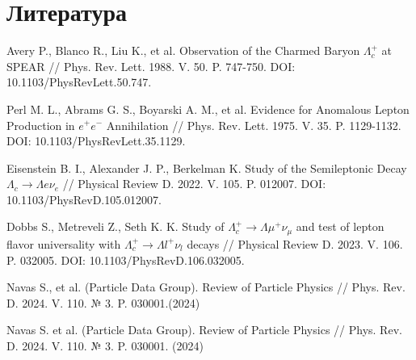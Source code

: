 \section{Литература}

\begin{thebibliography}{99}

    Avery P., Blanco R., Liu K., et al. Observation of the Charmed Baryon $\Lambda^+_c$ at SPEAR // Phys. Rev. Lett. 1988. V. 50. P. 747-750. DOI: 10.1103/PhysRevLett.50.747.
    
    Perl M. L., Abrams G. S., Boyarski A. M., et al. Evidence for Anomalous Lepton Production in $e^+e^-$ Annihilation // Phys. Rev. Lett. 1975. V. 35. P. 1129-1132. DOI: 10.1103/PhysRevLett.35.1129.
    
    Eisenstein B. I., Alexander J. P., Berkelman K. Study of the Semileptonic Decay $\Lambda_c \rightarrow \Lambda e \nu_e$ // Physical Review D. 2022. V. 105. P. 012007. DOI: 10.1103/PhysRevD.105.012007.
    
    Dobbs S., Metreveli Z., Seth K. K. Study of $\Lambda_c^+ \rightarrow \Lambda \mu^+ \nu_{\mu}$ and test of lepton flavor universality with $\Lambda_c^+ \rightarrow \Lambda l^+ \nu_l$ decays // Physical Review D. 2023. V. 106. P. 032005. DOI: 10.1103/PhysRevD.106.032005.
    
    Navas S., et al. (Particle Data Group). Review of Particle Physics // Phys. Rev. D. 2024. V. 110. $№$ 3. P. 030001.(2024)
    
    Navas S. et al. (Particle Data Group). Review of Particle Physics // Phys. Rev. D. 2024. V. 110. № 3. P. 030001. (2024)

\end{thebibliography}